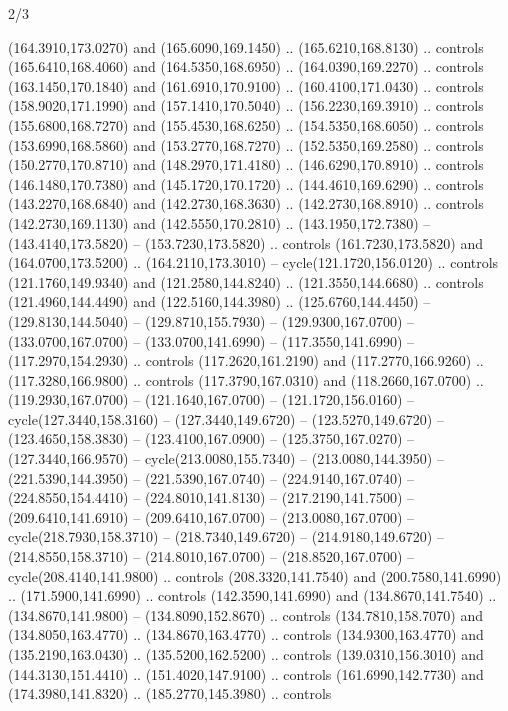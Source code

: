 \begin{flagdescription}{2/3}
\begin{scope}[xshift=0.5\flaglength,yshift=0.5\flagwidth,scale=\stretchfactor]
\begin{scope}[scale=0.001645\flagwidth,yshift=65mm,xshift=-63mm]
\begin{scope}[y=0.80pt, x=0.80pt, yscale=-1,]
\begin{scope}[cm={{1.33333,0.0,0.0,1.33333,(0.0,1e-05)}}]
  (164.3910,173.0270) and (165.6090,169.1450) .. (165.6210,168.8130) .. controls
  (165.6410,168.4060) and (164.5350,168.6950) .. (164.0390,169.2270) .. controls
  (163.1450,170.1840) and (161.6910,170.9100) .. (160.4100,171.0430) .. controls
  (158.9020,171.1990) and (157.1410,170.5040) .. (156.2230,169.3910) .. controls
  (155.6800,168.7270) and (155.4530,168.6250) .. (154.5350,168.6050) .. controls
  (153.6990,168.5860) and (153.2770,168.7270) .. (152.5350,169.2580) .. controls
  (150.2770,170.8710) and (148.2970,171.4180) .. (146.6290,170.8910) .. controls
  (146.1480,170.7380) and (145.1720,170.1720) .. (144.4610,169.6290) .. controls
  (143.2270,168.6840) and (142.2730,168.3630) .. (142.2730,168.8910) .. controls
  (142.2730,169.1130) and (142.5550,170.2810) .. (143.1950,172.7380) --
  (143.4140,173.5820) -- (153.7230,173.5820) .. controls (161.7230,173.5820) and
  (164.0700,173.5200) .. (164.2110,173.3010) -- cycle(121.1720,156.0120) ..
  controls (121.1760,149.9340) and (121.2580,144.8240) .. (121.3550,144.6680) ..
  controls (121.4960,144.4490) and (122.5160,144.3980) .. (125.6760,144.4450) --
  (129.8130,144.5040) -- (129.8710,155.7930) -- (129.9300,167.0700) --
  (133.0700,167.0700) -- (133.0700,141.6990) -- (117.3550,141.6990) --
  (117.2970,154.2930) .. controls (117.2620,161.2190) and (117.2770,166.9260) ..
  (117.3280,166.9800) .. controls (117.3790,167.0310) and (118.2660,167.0700) ..
  (119.2930,167.0700) -- (121.1640,167.0700) -- (121.1720,156.0160) --
  cycle(127.3440,158.3160) -- (127.3440,149.6720) -- (123.5270,149.6720) --
  (123.4650,158.3830) -- (123.4100,167.0900) -- (125.3750,167.0270) --
  (127.3440,166.9570) -- cycle(213.0080,155.7340) -- (213.0080,144.3950) --
  (221.5390,144.3950) -- (221.5390,167.0740) -- (224.9140,167.0740) --
  (224.8550,154.4410) -- (224.8010,141.8130) -- (217.2190,141.7500) --
  (209.6410,141.6910) -- (209.6410,167.0700) -- (213.0080,167.0700) --
  cycle(218.7930,158.3710) -- (218.7340,149.6720) -- (214.9180,149.6720) --
  (214.8550,158.3710) -- (214.8010,167.0700) -- (218.8520,167.0700) --
  cycle(208.4140,141.9800) .. controls (208.3320,141.7540) and
  (200.7580,141.6990) .. (171.5900,141.6990) .. controls (142.3590,141.6990) and
  (134.8670,141.7540) .. (134.8670,141.9800) -- (134.8090,152.8670) .. controls
  (134.7810,158.7070) and (134.8050,163.4770) .. (134.8670,163.4770) .. controls
  (134.9300,163.4770) and (135.2190,163.0430) .. (135.5200,162.5200) .. controls
  (139.0310,156.3010) and (144.3130,151.4410) .. (151.4020,147.9100) .. controls
  (161.6990,142.7730) and (174.3980,141.8320) .. (185.2770,145.3980) .. controls

\end{scope}
\end{scope}
\end{scope}
\end{scope}
\end{flagdescription}
